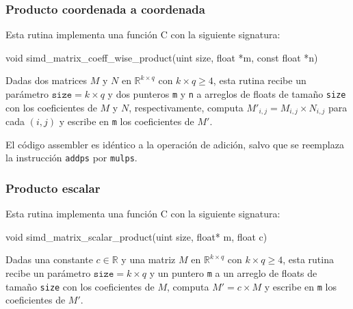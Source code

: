 \documentclass[a4paper, 10pt, twoside]{article}
\newcommand{\cc}[1]{\texttt{#1}}
\begin{document}
\subsubsection{Producto coordenada a coordenada}

Esta rutina implementa una función C con la siguiente signatura:

\begin{code}
  void simd_matrix_coeff_wise_product(uint size,
                                      float *m,
                                      const float *n)
\end{code}

Dadas dos matrices $M$ y $N$ en $\mathbb{R}^{k \times q}$ con $k \times q \geq
4$, esta rutina recibe un parámetro $\cc{size} = k \times q$ y dos punteros
\cc{m} y \cc{n} a arreglos de floats de tamaño \cc{size} con los coeficientes
de $M$ y $N$, respectivamente, computa $M'_{i,j} = M_{i,j} \times N_{i,j}$ para
cada $(i,j)$ y escribe en \cc{m} los coeficientes de $M'$.

El código assembler es idéntico a la operación de adición, salvo que se
reemplaza la instrucción \cc{addps} por \cc{mulps}.


\subsubsection{Producto escalar}

Esta rutina implementa una función C con la siguiente signatura:

\begin{code}
  void simd_matrix_scalar_product(uint size,
                                  float* m,
                                  float c)
\end{code}

Dadas una constante $c \in \mathbb{R}$ y una matriz $M$ en $\mathbb{R}^{k
\times q}$ con $k \times q \geq 4$, esta rutina recibe un parámetro $\cc{size}
= k \times q$ y un puntero \cc{m} a un arreglo de floats de tamaño \cc{size}
con los coeficientes de $M$, computa $M' = c \times M$ y escribe en \cc{m} los
coeficientes de $M'$.
\end{document}
